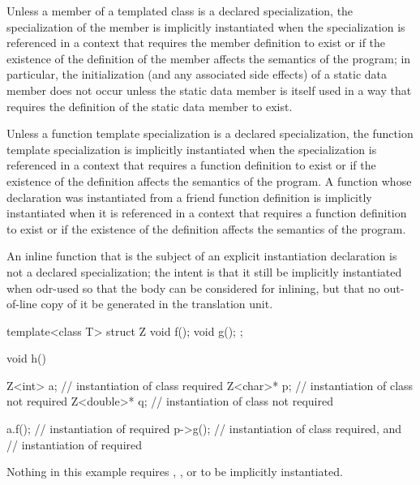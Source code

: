 \pnum
Unless a member of a templated class is a declared specialization,
the specialization of the member is implicitly instantiated when the
specialization is referenced in a context that requires the member definition
to exist or
if the existence of the definition of the member
affects the semantics of the program;
in particular, the initialization (and any associated side effects) of a
static data member does not occur unless the static data member is itself used
in a way that requires the definition of the static data member to exist.

\pnum
Unless a function template specialization is a declared specialization,
the function template specialization is implicitly instantiated when the
specialization is referenced in a context that requires a function definition
to exist or
if the existence of the definition affects the semantics of the program.
A function whose declaration was instantiated from a friend function definition is
implicitly instantiated when it is referenced in a context that
requires a function definition to exist or
if the existence of the definition affects the semantics of the program.
\begin{note}
An inline function
that is the subject of an explicit instantiation declaration
is not a declared specialization;
the intent is that it still be implicitly instantiated
when odr-used
so that the body can be considered for inlining,
but that no out-of-line copy of it be generated in the translation unit.
\end{note}

\pnum
\begin{example}
\begin{codeblock}
template<class T> struct Z {
  void f();
  void g();
};

void h() {
  Z<int> a;         // instantiation of class  required
  Z<char>* p;       // instantiation of class  not required
  Z<double>* q;     // instantiation of class  not required

  a.f();            // instantiation of  required
  p->g();           // instantiation of class  required, and
                    // instantiation of  required
}
\end{codeblock}

Nothing in this example requires
,
,
or
to be implicitly instantiated.
\end{example}

